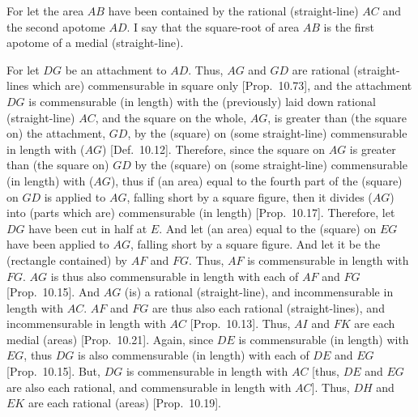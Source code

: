 \begin{Parallel}{}{}
{For let the area $AB$ have been contained by the rational (straight-line) $AC$ and the second apotome $AD$. I say that the square-root of area $AB$ is the first apotome of a medial (straight-line).

For let $DG$ be an attachment to $AD$. Thus, $AG$ and $GD$
are rational (straight-lines which are) commensurable in square only [Prop.~10.73],
and the attachment $DG$ is commensurable (in length) with the
(previously) laid down rational (straight-line) $AC$, and the square on
the whole, $AG$, is greater than (the square on) the attachment, $GD$,
by the (square) on (some straight-line) commensurable in length with ($AG$) 
[Def.~10.12]. Therefore, since the square on $AG$ is
greater than (the square on) $GD$ by the (square) on (some
straight-line) commensurable (in length) with ($AG$), thus if  (an area)
equal to the fourth part of the (square) on $GD$ is applied
to $AG$, falling short by a square figure, then it divides ($AG$) into (parts which
are) commensurable (in length) [Prop.~10.17]. 
Therefore, let $DG$ have been cut in half at $E$. And let (an area) equal to
the (square) on $EG$ have been applied to $AG$, falling short
by a square figure. And let it be the (rectangle contained) by $AF$ and $FG$.
Thus, $AF$ is commensurable in length with $FG$. $AG$ is thus
also commensurable in length with each of $AF$ and $FG$ [Prop.~10.15]. And $AG$ (is) a rational (straight-line), and incommensurable in length with $AC$. $AF$ and $FG$
are thus also each rational (straight-lines), and incommensurable in length with
$AC$ [Prop.~10.13].
Thus, $AI$
and $FK$ are each medial (areas) [Prop.~10.21]. 
Again, since $DE$ is commensurable (in length) with $EG$, thus
$DG$ is also commensurable (in length) with each of $DE$ and $EG$ [Prop.~10.15]. But, $DG$ is commensurable
in length with $AC$ [thus, $DE$ and $EG$ are also each rational, and
commensurable in length with $AC$]. Thus, $DH$ and $EK$ are each
rational (areas) [Prop.~10.19].

}
\end{Parallel}

